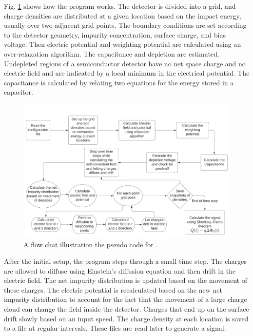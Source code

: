 Fig. \ref{fig:ehd_flowchart} shows how the {\tdsim} program works. The detector is divided into a grid, and charge densities are distributed at a given location based on the impact energy, usually over two adjacent grid points. The boundary conditions are set according to the detector geometry, impurity concentration, surface charge, and bias voltage. Then electric potential and weighting potential are calculated using an over-relaxation algorithm. The capacitance and depletion are estimated. Undepleted regions of a semiconductor detector have no net space charge and no electric field and are indicated by a local minimum in the electrical potential. The capacitance is calculated by relating two equations for the energy stored in a capacitor.


\begin{figure}
\centering
\includegraphics[width=0.8\linewidth]{ch3/figs/ehdrift_flowchart.png}
\caption{A flow chat illustration the pseudo code for {\tdsim}.}
\label{fig:ehd_flowchart}
\end{figure}

After the initial setup, the program steps through a small time step. The charges are allowed to diffuse using Einstein's diffusion equation and then drift in the electric field. The net impurity distribution is updated based on the movement of these charges. The electric potential is recalculated based on the new net impurity distribution to account for the fact that the movement of a large charge cloud can change the field inside the detector. Charges that end up on the surface drift slowly based on an input speed. The charge density at each location is saved to a file at regular intervals. These files are read later to generate a signal.

